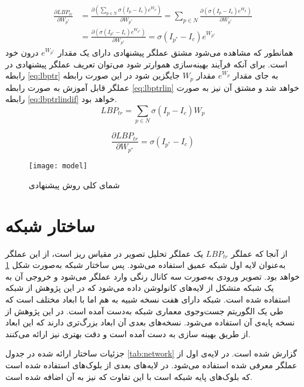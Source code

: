 \begin{align}\label{eq:lbptrdif}
	\frac{\partial LBP_{tr}}{\partial W_{p^*}} 
	&= \frac{\partial (\sum_{p\in N}\sigma(I_p-I_c)e^{W_p}) }{\partial W_{p^*}} 
	= \sum_{p\in N} {\frac{\partial (\sigma(I_p-I_c)e^{W_p}) }{\partial W_{p^*}} }
	\\&= 	\frac{\partial (\sigma(I_{p^*}-I_c)e^{W_{p^*}})}{\partial W_{p^*}}
	= \sigma(I_{p^*}-I_c)e^{W_{p^*}}
	\nonumber
\end{align}
همانطور که مشاهده می‌شود مشتق عملگر پیشنهادی دارای یک مقدار 
$e^{W_{p^*}}$
درون خود است. برای آنکه فرآیند بهینه‌سازی هموارتر شود می‌توان تعریف عملگر پیشنهادی در رابطه 
\ref{eq:lbptr}
به جای مقدار 
$e^{W_p}$
مقدار 
$W_p$
جایگزین شود در این صورت رابطه عملگر قابل آموزش به صورت رابطه 
\ref{eq:lbptrlin}
خواهد شد و مشتق آن نیز به صورت رابطه 
\ref{eq:lbptrlindif}
خواهد بود.
\begin{equation}\label{eq:lbptrlin}
	LBP_{tr}=\sum_{p\in N}\sigma(I_p-I_c)W_p 
\end{equation}

\begin{equation}\label{eq:lbptrlindif}
	\frac{\partial LBP_{tr}}{\partial W_{p^*}}=
	\sigma(I_{p^*}-I_c)
\end{equation}


\begin{figure}[ht]
	\centerline{\texttt{[image: model]}}
	\caption{شمای کلی روش پیشنهادی}
	\label{fig:model}
\end{figure}  
\section{ساختار شبکه}
 از آنجا که عملگر  
$LBP_{tr}$
 یک عملگر تحلیل تصویر در مقیاس ریز است، از این عملگر به‌عنوان لایه اول شبکه عمیق استفاده می‌شود. پس ساختار شبکه به‌صورت شکل 
\ref{fig:model}
 خواهد بود.
 تصویر ورودی به‌صورت سه کانال رنگی وارد عملگر   می‌شود و خروجی آن به یک شبکه متشکل از لایه‌های کانولوشن داده می‌شود که در این پژوهش از شبکه
   \cite{tan2019efficientnet}
 استفاده شده است. شبکه 
 دارای هفت نسخه شبیه به هم اما با ابعاد مختلف است که طی یک الگوریتم جست‌و‌جوی معماری شبکه به‌دست آمده است. در این پژوهش از نسخه پایه‌ی آن استفاده می‌شود. نسخه‌های بعدی آن ابعاد بزرگ‌تری دارند که این ابعاد از طریق بهینه سازی به دست آمده است و دقت بهتری نیز ارائه می‌کنند.
 
 جزئیات ساختار ارائه شده در جدول 
 \ref{tab:network}
 گزارش شده است. در لایه‌ی اول از عملگر معرفی شده استفاده می‌شود. در لایه‌های بعدی از بلوک‌های
 استفاده شده است که بلوک‌های پایه شبکه 
  \cite{sandler2018mobilenetv2}
 است با این تفاوت که 
  \cite{hu2018squeeze}
 نیز به آن اضافه شده است.
 
